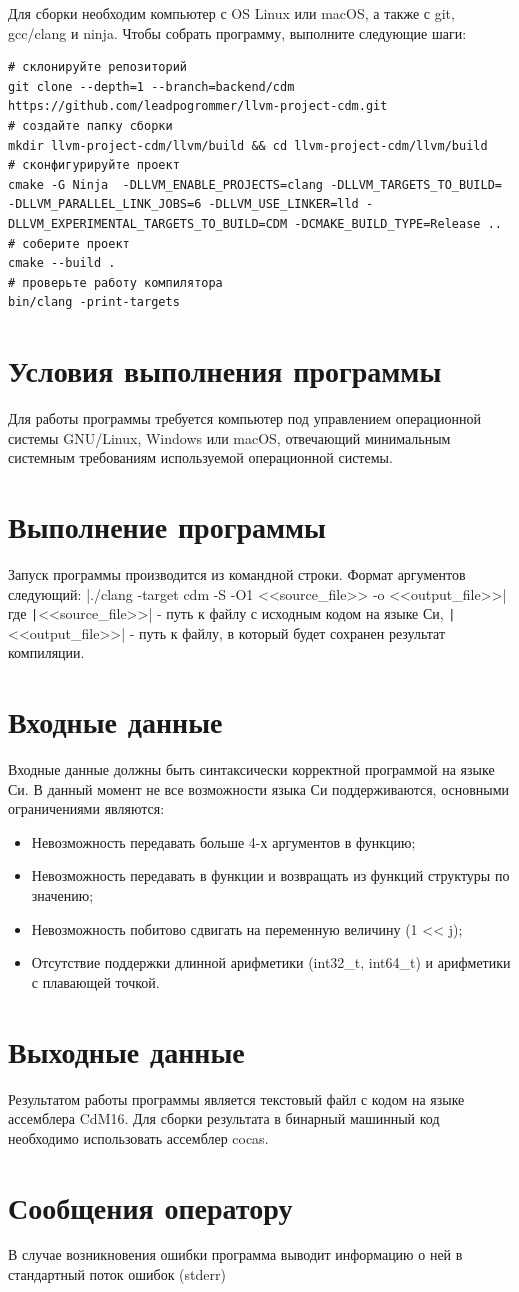 \documentclass[a4paper,14pt]{extarticle}
\begin{document}
Для сборки необходим компьютер с OS Linux или macOS, а также с git, gcc/clang и ninja. Чтобы собрать программу, выполните следующие шаги:
\begin{verbatim}
# склонируйте репозиторий
git clone --depth=1 --branch=backend/cdm https://github.com/leadpogrommer/llvm-project-cdm.git
# создайте папку сборки
mkdir llvm-project-cdm/llvm/build && cd llvm-project-cdm/llvm/build
# сконфигурируйте проект
cmake -G Ninja  -DLLVM_ENABLE_PROJECTS=clang -DLLVM_TARGETS_TO_BUILD= -DLLVM_PARALLEL_LINK_JOBS=6 -DLLVM_USE_LINKER=lld -DLLVM_EXPERIMENTAL_TARGETS_TO_BUILD=CDM -DCMAKE_BUILD_TYPE=Release ..
# соберите проект
cmake --build .
# проверьте работу компилятора
bin/clang -print-targets 
\end{verbatim}

\section{Условия выполнения программы}
Для работы программы требуется компьютер под управлением операционной системы GNU/Linux, Windows или macOS, отвечающий минимальным системным требованиям используемой операционной системы.
\section{Выполнение программы}
Запуск программы производится из командной строки. Формат аргументов следующий:
|./clang -target cdm -S -O1 <<source_file>> -o <<output_file>>|
где \texttt|<<source_file>>| - путь к файлу с исходным кодом на языке Си, \texttt|<<output_file>>| - путь к файлу, в который будет сохранен результат компиляции.
\section{Входные данные}
Входные данные должны быть синтаксически корректной программой на языке Си. В данный момент не все возможности языка Си поддерживаются, основными ограничениями являются:
\begin{itemize}
\item Невозможность передавать больше 4-х аргументов в функцию;
\item Невозможность передавать в функции и возвращать из функций структуры по значению;
\item Невозможность побитово сдвигать на переменную величину (1 << j);
\item Отсутствие поддержки длинной арифметики (int32\_t, int64\_t) и арифметики с плавающей точкой.
\end{itemize}
\section{Выходные данные}
Результатом работы программы является текстовый файл с кодом на языке ассемблера CdM16. Для сборки результата в бинарный машинный код необходимо использовать ассемблер cocas.
\section{Сообщения оператору}
В случае возникновения ошибки программа выводит информацию о ней в стандартный поток ошибок (stderr)
\end{document}
